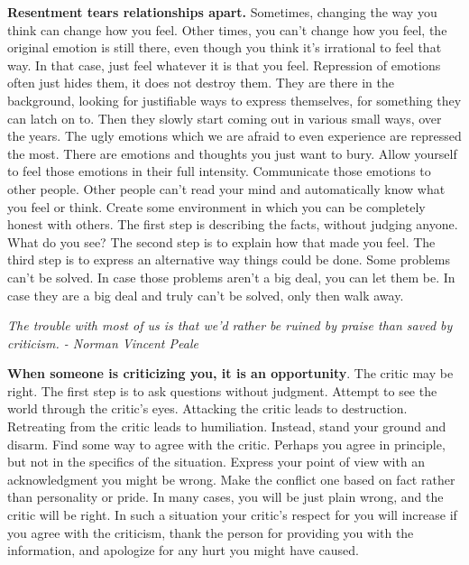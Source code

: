 \documentclass[a4paper,hidelinks]{article}
\begin{document}
\textbf{Resentment tears relationships apart.}
Sometimes, changing the way you think can change how you feel.
Other times, you can't change how you feel, the original emotion is still there, even though you think it's irrational to feel that way.
In that case, just feel whatever it is that you feel.
Repression of emotions often just hides them, it does not destroy them.
They are there in the background, looking for justifiable ways to express themselves, for something they can latch on to.
Then they slowly start coming out in various small ways, over the years.
The ugly emotions which we are afraid to even experience are repressed the most.
There are emotions and thoughts you just want to bury.
Allow yourself to feel those emotions in their full intensity.
Communicate those emotions to other people.
Other people can't read your mind and automatically know what you feel or think.
Create some environment in which you can be completely honest with others.
The first step is describing the facts, without judging anyone.
What do you see?
The second step is to explain how that made you feel.
The third step is to express an alternative way things could be done.
Some problems can't be solved.
In case those problems aren't a big deal, you can let them be.
In case they are a big deal and truly can't be solved, only then walk away.

\newpage

\begin{center}
\textit{
The trouble with most of us is that we'd rather be ruined by praise than saved by criticism. - Norman Vincent Peale
}
\end{center}

\textbf{When someone is criticizing you, it is an opportunity}.
The critic may be right.
The first step is to ask questions without judgment.
Attempt to see the world through the critic's eyes.
Attacking the critic leads to destruction.
Retreating from the critic leads to humiliation.
Instead, stand your ground and disarm.
Find some way to agree with the critic.
Perhaps you agree in principle, but not in the specifics of the situation.
Express your point of view with an acknowledgment you might be wrong.
Make the conflict one based on fact rather than personality or pride.
In many cases, you will be just plain wrong, and the critic will be right.
In such a situation your critic's respect for you will increase if you agree with the criticism, thank the person for providing you with the information, and apologize for any hurt you might have caused.
\end{document}
